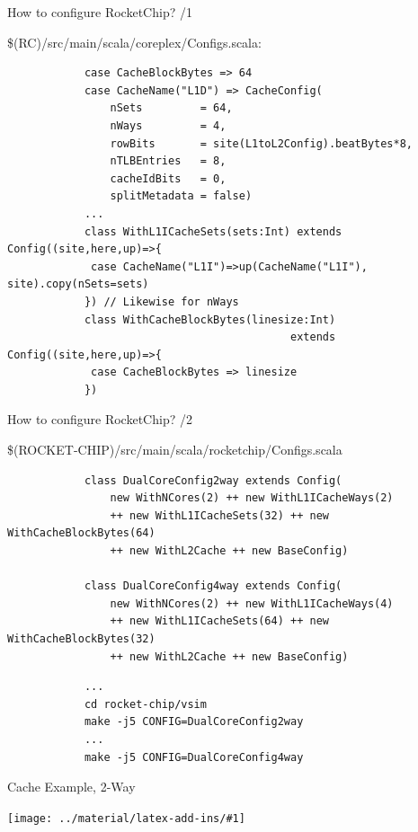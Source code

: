 \documentclass[]{beamer} %
\newcommand*{\COMPILEIMAGES}{}%
\newcommand\inputimage[1]{%
	\ifdefined\COMPILEIMAGES
		
	\else
		\texttt{[image: ../material/latex-add-ins/\#1]}
	\fi
	}
\newenvironment{fullpage}[0]{%
	\begin{list}{}{%
		\setlength{\leftmargin}{-7mm}%
		\setlength{\rightmargin}{-7mm}%
		\vspace*{-10pt}
		}%
\item[]}{\end{list}}
\begin{document}
\begin{frame}[fragile]{How to configure RocketChip? /1}
	\begin{fullpage}
		\$(RC)/src/main/scala/coreplex/Configs.scala:
		\begin{verbatim}
			case CacheBlockBytes => 64
			case CacheName("L1D") => CacheConfig(
				nSets         = 64,
				nWays         = 4,
				rowBits       = site(L1toL2Config).beatBytes*8,
				nTLBEntries   = 8,
				cacheIdBits   = 0,
				splitMetadata = false)
			...
			class WithL1ICacheSets(sets:Int) extends Config((site,here,up)=>{
			 case CacheName("L1I")=>up(CacheName("L1I"), site).copy(nSets=sets)
			}) // Likewise for nWays
			class WithCacheBlockBytes(linesize:Int)
											extends Config((site,here,up)=>{
			 case CacheBlockBytes => linesize
			})
		\end{verbatim}
	\end{fullpage}
\end{frame}

\begin{frame}[fragile]{How to configure RocketChip? /2}
	\begin{fullpage}
	\$(ROCKET-CHIP)/src/main/scala/rocketchip/Configs.scala
		\begin{verbatim}
			class DualCoreConfig2way extends Config(
				new WithNCores(2) ++ new WithL1ICacheWays(2)
				++ new WithL1ICacheSets(32) ++ new WithCacheBlockBytes(64)
				++ new WithL2Cache ++ new BaseConfig)

			class DualCoreConfig4way extends Config(
				new WithNCores(2) ++ new WithL1ICacheWays(4)
				++ new WithL1ICacheSets(64) ++ new WithCacheBlockBytes(32)
				++ new WithL2Cache ++ new BaseConfig)
		\end{verbatim}
		\pause
		\begin{verbatim}
			...
			cd rocket-chip/vsim
			make -j5 CONFIG=DualCoreConfig2way
			...
			make -j5 CONFIG=DualCoreConfig4way
		\end{verbatim}
	\end{fullpage}
\end{frame}

\begin{frame}{Cache Example, 2-Way}
	\begin{fullpage}
		\fourwayfalse
		\inputimage{image1}
	\end{fullpage}
\end{frame}
\end{document}
